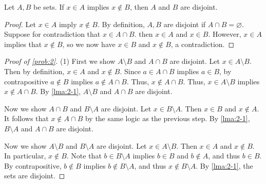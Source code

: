 \documentclass[11pt, letterpaper]{article}
\begin{document}
\begin{lemma}\label{lma:2-1}
	Let $A,B$ be sets. If $x\in A$ implies $x\notin B$, then $A$ and $B$ are disjoint.
\end{lemma}
\begin{proof}
	Let $x\in A$ imply $x\notin B$. By definition, $A,B$ are disjoint if $A \cap B=\varnothing $. Suppose for contradiction that $x\in A \cap B$. then $x\in A$ and $x\in B$. However, $x\in A$ implies that $x\notin B$, so we now have $x\in B$ and $x\notin B$, a contradiction.
\end{proof}

\begin{proof}[Proof of \cref{prob:2}]
	(1) First we show $A\setminus B$ and $A \cap B$ are disjoint. Let $x\in A \setminus B$. Then by definition, $x\in A$ and $x\notin B$. Since $a\in A \cap B$ implies $a\in B$, by contrapositive $a\notin B$ implies $a\notin A \cap B$. Thus, $x\notin A \cap B$. Thus, $x\in A \setminus B$ implies $x\notin A \cap B$. By \cref{lma:2-1}, $A\setminus B$ and $A \cap B$ are disjoint.

	Now we show $A \cap B$ and $B\setminus A$ are disjoint. Let $x\in B\setminus A$. Then $x\in B$ and $x\notin A$. It follows that $x\notin A \cap B$ by the same logic as the previous step. By \cref{lma:2-1}, $B\setminus A$ and $A \cap B$ are disjoint.

	Now we show $A\setminus B$ and $B\setminus A$ are disjoint. Let $x\in A\setminus B$. Then $x\in A$ and $x\notin B$. In particular, $x\notin B$. Note that $b\in B\setminus A$ implies $b\in B$ and $b \notin A$, and thus $b\in B$. By contrapositive, $b\notin B$ implies $b\notin B\setminus A$, and thus $x\notin B\setminus A$. By \cref{lma:2-1}, the sets are disjoint.


\end{proof}
\end{document}
